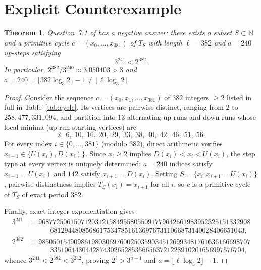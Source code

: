 \documentclass[11pt]{article}
\newtheorem{theorem}{Theorem}
\begin{document}
\section{Explicit Counterexample}

\begin{theorem}\label{thm:main}
Question~7.1 of \cite{Vasilyev2026} has a negative answer: there exists a subset $S \subset \mathbb{N}$ and a primitive cycle $c = (x_0,\dots,x_{381})$ of $T_S$ with length $\ell = 382$ and $a = 240$ up-steps satisfying
\[
3^{241} < 2^{382}.
\]
In particular, $2^{382}/3^{240} \approx 3.050403 > 3$ and $a = 240 = \lfloor 382 \log_3 2 \rfloor - 1 \neq \lfloor \ell \log_3 2 \rfloor$.
\end{theorem}

\begin{proof}
Consider the sequence $c = (x_0,x_1,\dots,x_{381})$ of $382$ integers $\ge 2$ listed in full in Table~\ref{tab:cycle}. Its vertices are pairwise distinct, ranging from $2$ to $258{,}477{,}331{,}094$, and partition into $13$ alternating up-runs and down-runs whose local minima (up-run starting vertices) are
\[
2,\; 6,\; 10,\; 16,\; 20,\; 29,\; 33,\; 38,\; 40,\; 42,\; 46,\; 51,\; 56.
\]
For every index $i \in \{0,\dots,381\}$ (modulo $382$), direct arithmetic verifies $x_{i+1} \in \{U(x_i), D(x_i)\}$. Since $x_i \ge 2$ implies $D(x_i) < x_i < U(x_i)$, the step type at every vertex is uniquely determined: $a = 240$ indices satisfy $x_{i+1} = U(x_i)$ and $142$ satisfy $x_{i+1} = D(x_i)$. Setting $S = \{x_i : x_{i+1} = U(x_i)\}$, pairwise distinctness implies $T_S(x_i) = x_{i+1}$ for all $i$, so $c$ is a primitive cycle of $T_S$ of exact period $382$.

Finally, exact integer exponentiation gives
\begin{align*}
3^{241} &= 968772506150712031215849558055091779642661983952325151332908\\
        &\qquad\quad 6812944808568617534785161369767311066873140028406651043,\\
2^{382} &= 985050154909861980306976002503590345126993481761636166698707\\
        &\qquad\quad 3351061430442874302652853566563721228910201656997576704,
\end{align*}
whence $3^{241} < 2^{382} < 3^{242}$, proving $2^\ell > 3^{a+1}$ and $a = \lfloor \ell \log_3 2 \rfloor - 1$.
\end{proof}
\end{document}
